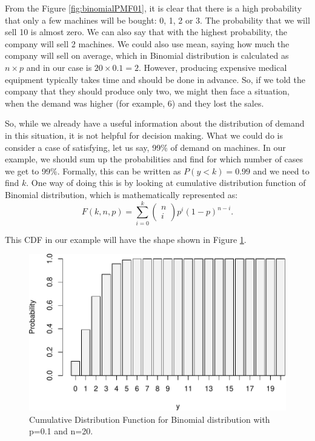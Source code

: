 \documentclass[
]{book}
\theoremstyle{definition}
\theoremstyle{definition}
\theoremstyle{definition}
\theoremstyle{definition}
\theoremstyle{remark}
\begin{document}
From the Figure \ref{fig:binomialPMF01}, it is clear that there is a high probability that only a few machines will be bought: 0, 1, 2 or 3. The probability that we will sell 10 is almost zero. We can also say that with the highest probability, the company will sell 2 machines. We could also use mean, saying how much the company will sell on average, which in Binomial distribution is calculated as \(n \times p\) and in our case is \(20 \times 0.1 = 2\). However, producing expensive medical equipment typically takes time and should be done in advance. So, if we told the company that they should produce only two, we might then face a situation, when the demand was higher (for example, 6) and they lost the sales.

So, while we already have a useful information about the distribution of demand in this situation, it is not helpful for decision making. What we could do is consider a case of satisfying, let us say, 99\% of demand on machines. In our example, we should sum up the probabilities and find for which number of cases we get to 99\%. Formally, this can be written as \(P(y<k)=0.99\) and we need to find \(k\). One way of doing this is by looking at cumulative distribution function of Binomial distribution, which is mathematically represented as:
\begin{equation}
    F(k, n, p) = \sum_{i=0}^k \begin{pmatrix} n \\ i \end{pmatrix} p^i (1-p)^{n-i} .
    \label{eq:BernoulliPMF}
\end{equation}

This CDF in our example will have the shape shown in Figure \ref{fig:binomialCDF01}.

\begin{figure}
\centering
\includegraphics{Svetunkov---Statistics-for-Business-Analytics_files/figure-latex/binomialCDF01-1.pdf}
\caption{\label{fig:binomialCDF01}Cumulative Distribution Function for Binomial distribution with p=0.1 and n=20.}
\end{figure}
\end{document}
